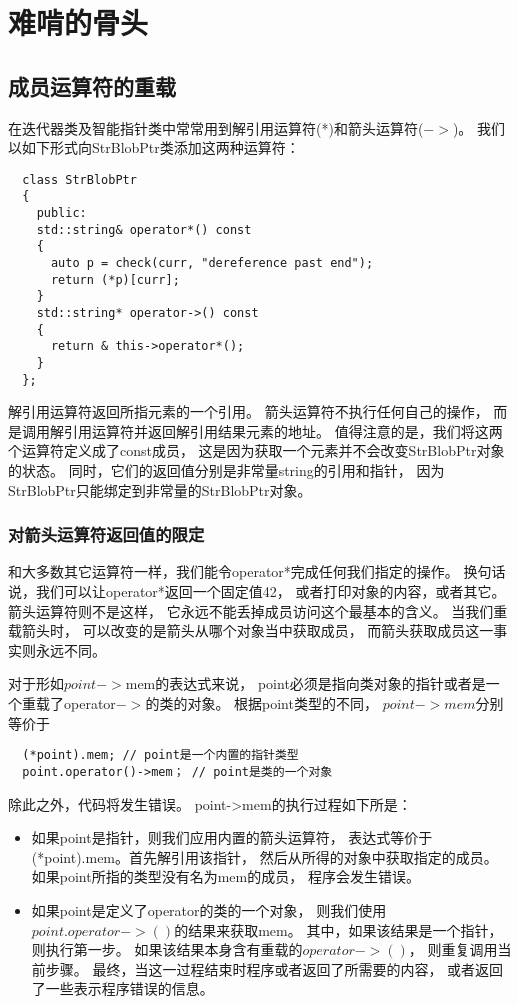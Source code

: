 \chapter{难啃的骨头}
\section{成员运算符的重载}
在迭代器类及智能指针类中常常用到解引用运算符(*)和箭头运算符($->$)。%
我们以如下形式向StrBlobPtr类添加这两种运算符：
\begin{lstlisting}
  class StrBlobPtr
  {
    public:
    std::string& operator*() const
    {
      auto p = check(curr, "dereference past end");
      return (*p)[curr];
    }
    std::string* operator->() const
    {
      return & this->operator*();
    }
  };
\end{lstlisting}
解引用运算符返回所指元素的一个引用。%
箭头运算符不执行任何自己的操作，%
而是调用解引用运算符并返回解引用结果元素的地址。%
值得注意的是，我们将这两个运算符定义成了const成员，%
这是因为获取一个元素并不会改变StrBlobPtr对象的状态。%
同时，它们的返回值分别是非常量string的引用和指针，%
因为StrBlobPtr只能绑定到非常量的StrBlobPtr对象。%
\subsection{对箭头运算符返回值的限定}
和大多数其它运算符一样，我们能令operator*完成任何我们指定的操作。%
换句话说，我们可以让operator*返回一个固定值42，%
或者打印对象的内容，或者其它。%
箭头运算符则不是这样，%
它永远不能丢掉成员访问这个最基本的含义。%
当我们重载箭头时，%
可以改变的是箭头从哪个对象当中获取成员，%
而箭头获取成员这一事实则永远不同。%
\par
对于形如$point->$mem的表达式来说，%
point必须是指向类对象的指针或者是一个重载了operator$->$的类的对象。%
根据point类型的不同，%
$point->mem$分别等价于
\begin{lstlisting}
  (*point).mem; // point是一个内置的指针类型
  point.operator()->mem； // point是类的一个对象
\end{lstlisting}
除此之外，代码将发生错误。%
point->mem的执行过程如下所是：
\begin{itemize}
\item{如果point是指针，则我们应用内置的箭头运算符，%
    表达式等价于(*point).mem。首先解引用该指针，%
    然后从所得的对象中获取指定的成员。%
    如果point所指的类型没有名为mem的成员，%
    程序会发生错误。
  }
\item{如果point是定义了operator的类的一个对象，%
    则我们使用$point.operator->()$的结果来获取mem。%
    其中，如果该结果是一个指针，则执行第一步。%
    如果该结果本身含有重载的$operator->()$，%
    则重复调用当前步骤。%
    最终，当这一过程结束时程序或者返回了所需要的内容，%
    或者返回了一些表示程序错误的信息。
  }
\end{itemize}
